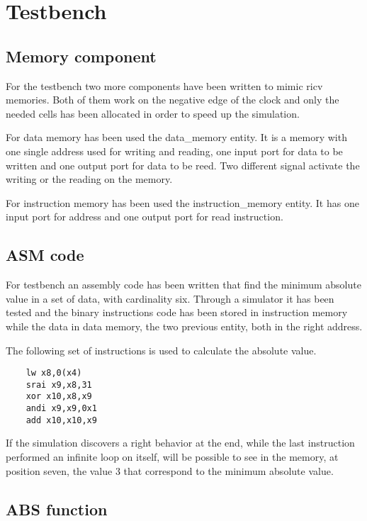 %
\chapter{Testbench}
\label{cha5}

\section{Memory component}

For the testbench two more components have been written to mimic ricv memories. Both of them
work on the negative edge of the clock and only the needed cells has been allocated in order 
to speed up the simulation.

For data memory has been used the data\_memory entity. It is a memory with one single address used
for writing and reading, one input port for data to be written and one output port 
for data to be reed. Two different signal activate the writing or the reading on the memory.

For instruction memory has been used the instruction\_memory entity. It has one input port
for address and one output port for read instruction.

\section{ASM code}

For testbench an assembly code has been written that find the minimum absolute value in a 
set of data, with cardinality six. Through a simulator it has been tested and the binary instructions code has been 
stored in instruction memory while the data in data memory, the two previous entity, both in the right address.

The following set of instructions is used to calculate the absolute value.
\begin{lstlisting}
    lw x8,0(x4)       
    srai x9,x8,31     
    xor x10,x8,x9     
    andi x9,x9,0x1    
    add x10,x10,x9   
\end{lstlisting}

If the simulation discovers a right behavior at the end, while the last instruction performed an infinite loop 
on itself, will be possible to see in the memory, at position seven, the value 3 that correspond to the minimum 
absolute value.

\section{ABS function}


